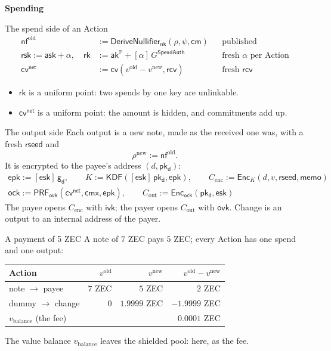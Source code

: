 \documentclass[aspectratio=169,11pt]{beamer}
\newcommand{\nfsym}{\ensuremath{\mathsf{nf}}}
\newcommand{\cmsym}{\ensuremath{\mathsf{cm}}}
\newcommand{\cmx}{\ensuremath{\mathsf{cmx}}}
\newcommand{\cvsym}{\ensuremath{\mathsf{cv}}}
\newcommand{\rksym}{\ensuremath{\mathsf{rk}}}
\newcommand{\gd}{\ensuremath{\mathsf{g_d}}}
\newcommand{\pkd}{\ensuremath{\mathsf{pk_d}}}
\newcommand{\aksym}{\ensuremath{\mathsf{ak}}}
\newcommand{\nksym}{\ensuremath{\mathsf{nk}}}
\newcommand{\asksym}{\ensuremath{\mathsf{ask}}}
\newcommand{\ivk}{\ensuremath{\mathsf{ivk}}}
\newcommand{\ovk}{\ensuremath{\mathsf{ovk}}}
\newcommand{\rcv}{\ensuremath{\mathsf{rcv}}}
\newcommand{\rsk}{\ensuremath{\mathsf{rsk}}}
\newcommand{\esk}{\ensuremath{\mathsf{esk}}}
\newcommand{\epk}{\ensuremath{\mathsf{epk}}}
\newcommand{\vbal}{\ensuremath{v_{\mathrm{balance}}}}
\newcommand{\divider}[1]{\begin{frame}[plain]\vfill\centering
  {\usebeamercolor[fg]{structure}\Huge\bfseries #1}\vfill\end{frame}}
\newcommand{\PP}{\mathbb{P}}
\newcommand{\akP}{\aksym^{\PP}}
\newcommand{\rk}{\rksym}
\newcommand{\PRF}[1]{\mathsf{PRF}_{#1}}
\newcommand{\KDF}{\mathsf{KDF}}
\newcommand{\Enc}{\mathsf{Enc}}
\newcommand{\DNf}{\mathsf{DeriveNullifier}}
\newcommand{\GS}{G^{\mathsf{SpendAuth}}}
\newcommand{\cvnet}{\cvsym^{\mathsf{net}}}
\newcommand{\rseed}{\mathsf{rseed}}
\begin{document}
\divider{Spending}

\begin{frame}{The spend side of an Action}
\begin{align*}
\nfsym^{\mathrm{old}} &:= \DNf_{\nksym}(\rho, \psi, \cmsym) && \text{published} \\
\rsk := \asksym + \alpha, \quad \rk &:= \akP + [\alpha]\,\GS && \text{fresh } \alpha \text{ per Action} \\
\cvnet &:= \cvsym(v^{\mathrm{old}} - v^{\mathrm{new}}, \rcv) && \text{fresh } \rcv
\end{align*}
\vfill
\begin{itemize}\itemsep5pt
\item $\rk$ is a uniform point: two spends by one key are unlinkable.
\item $\cvnet$ is a uniform point: the amount is hidden, and commitments add up.
\end{itemize}
\end{frame}

\begin{frame}{The output side}
Each output is a new note, made as the received one was, with a fresh
$\rseed$ and
\[
\rho^{\mathrm{new}} := \nfsym^{\mathrm{old}} .
\]
It is encrypted to the payee's address $(d, \pkd)$:
\begin{gather*}
\epk := [\esk]\,\gd, \qquad K := \KDF([\esk]\,\pkd, \epk), \qquad
C_{\mathrm{enc}} := \Enc_K(d, v, \rseed, \mathsf{memo}) \\
\mathsf{ock} := \PRF{\ovk}(\cvnet, \cmx, \epk), \qquad
C_{\mathrm{out}} := \Enc_{\mathsf{ock}}(\pkd, \esk)
\end{gather*}
\vfill
The payee opens $C_{\mathrm{enc}}$ with $\ivk$; the payer opens
$C_{\mathrm{out}}$ with $\ovk$. Change is an output to an internal address
of the payer.
\end{frame}

\begin{frame}{A payment of 5 ZEC}
A note of $7$ ZEC pays $5$ ZEC; every Action has one spend and one output:
\vfill
\begin{center}
\begin{tabular}{@{}lrrr@{}}
\toprule
Action & $v^{\mathrm{old}}$ & $v^{\mathrm{new}}$ & $v^{\mathrm{old}} - v^{\mathrm{new}}$ \\
\midrule
note $\to$ payee & $7$ ZEC & $5$ ZEC & $2$ ZEC \\
dummy $\to$ change & $0$ & $1.9999$ ZEC & $-1.9999$ ZEC \\
\midrule
$\vbal$ (the fee) & & & $0.0001$ ZEC \\
\bottomrule
\end{tabular}
\end{center}
\vfill
The value balance $\vbal$ leaves the shielded pool: here, as the fee.
\end{frame}
\end{document}
